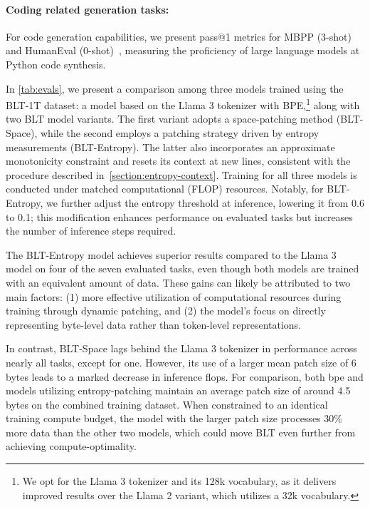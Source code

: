 \paragraph{Coding related generation tasks:} For code generation capabilities, we present pass@1 metrics for MBPP (3-shot)~\citep{Eval_MBPP} and HumanEval (0-shot)~\citep{Eval_HumanEval}, measuring the proficiency of large language models at Python code synthesis.

In \autoref{tab:evals}, we present a comparison among three models trained using the {\textsc BLT}-1T dataset: a model based on the Llama 3 tokenizer with BPE,\footnote{We opt for the Llama 3 tokenizer and its 128k vocabulary, as it delivers improved results over the Llama 2 variant, which utilizes a 32k vocabulary.} along with two {\textsc BLT} model variants. The first variant adopts a space-patching method ({\textsc BLT}-Space), while the second employs a patching strategy driven by entropy measurements ({\textsc BLT}-Entropy). The latter also incorporates an approximate monotonicity constraint and resets its context at new lines, consistent with the procedure described in~\autoref{section:entropy-context}. Training for all three models is conducted under matched computational (FLOP) resources. Notably, for {\textsc BLT}-Entropy, we further adjust the entropy threshold at inference, lowering it from 0.6 to 0.1; this modification enhances performance on evaluated tasks but increases the number of inference steps required.

The {\textsc BLT}-Entropy model achieves superior results compared to the Llama 3 model on four of the seven evaluated tasks, even though both models are trained with an equivalent amount of data. These gains can likely be attributed to two main factors: (1) more effective utilization of computational resources during training through dynamic patching, and (2) the model’s focus on directly representing byte-level data rather than token-level representations.

In contrast, {\textsc BLT}-Space lags behind the Llama 3 tokenizer in performance across nearly all tasks, except for one. However, its use of a larger mean patch size of 6 bytes leads to a marked decrease in inference flops. For comparison, both bpe and models utilizing entropy-patching maintain an average patch size of around 4.5 bytes on the combined training dataset. When constrained to an identical training compute budget, the model with the larger patch size processes 30\% more data than the other two models, which could move {\textsc BLT} even further from achieving compute-optimality.


